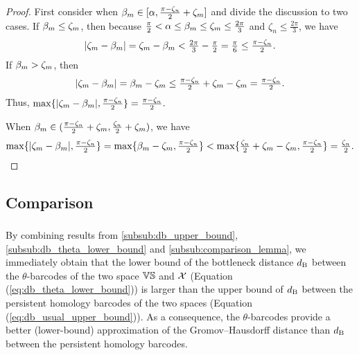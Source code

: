 \begin{proof}
        First consider when $\beta_m \in [\alpha, \tfrac{\pi - \zeta_n}{2}+\zeta_m]$ and divide the discussion to two cases.  
        If $\beta_m \leq \zeta_m$, then because $\tfrac{\pi}{2} < \alpha \leq \beta_m \leq \zeta_m  \leq \tfrac{2\pi}{3}$ and $\zeta_n \leq \tfrac{2\pi}{3}$, we have
        \[
            |\zeta_m  - \beta_m | 
            = \zeta_m  - \beta_m  
            < \tfrac{2\pi}{3} - \tfrac{\pi}{2} 
            = \tfrac{\pi}{6} 
            \leq \tfrac{\pi - \zeta_n}{2}.
        \]
        If $\beta_m > \zeta_m$, then 
        \[
            |\zeta_m  - \beta_m | 
            = \beta_m - \zeta_m
            \leq \tfrac{\pi - \zeta_n}{2} + \zeta_m - \zeta_m 
            = \tfrac{\pi - \zeta_n}{2}.
        \]
        Thus, $\max\{|\zeta_m  - \beta_m |, \tfrac{\pi - \zeta_n}{2}\} = \tfrac{\pi - \zeta_n}{2}.$
        
        When $\beta_m \in (\tfrac{\pi - \zeta_n}{2}+\zeta_m, \tfrac{\zeta_n}{2}+\zeta_m)$, we have
        \[
            \max\{|\zeta_m  - \beta_m |, \tfrac{\pi - \zeta_n}{2}\}
            = \max\{\beta_m - \zeta_m, \tfrac{\pi - \zeta_n}{2}\}
            < \max\{\tfrac{\zeta_n}{2}+\zeta_m - \zeta_m, \tfrac{\pi - \zeta_n}{2}\}
            = \tfrac{\zeta_n}{2} .
        \]
\end{proof}

\subsection{Comparison}
\label{subsub:main_theorem}

\subsubsection{}
By combining results from \cref{subsub:db_upper_bound}, \cref{subsub:db_theta_lower_bound} and \cref{subsub:comparison_lemma}, we immediately obtain that the lower bound of the bottleneck distance $d_{\mathrm{B}}$ between the $\theta$-barcodes of the two space $\mathbb{V}\mathbb{S}$ and $\mathcal{X}$ (Equation (\ref{eq:db_theta_lower_bound})) is larger than the upper bound of $d_{\mathrm{B}}$ between the persistent homology barcodes of the two spaces (Equation (\ref{eq:db_usual_upper_bound})). 
As a consequence, the $\theta$-barcodes provide a better (lower-bound) approximation of the Gromov--Hausdorff distance than $d_{\mathrm{B}}$ between the persistent homology barcodes.

